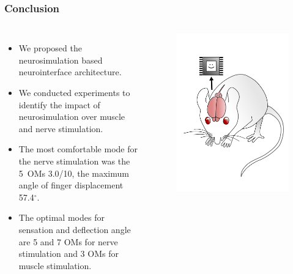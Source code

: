 \documentclass[12pt, aspectratio=169]{beamer}
\begin{document}
\begin{frame}
  \frametitle{Conclusion}
\begin{columns}[c]
 
\begin{itemize}
  \item We proposed the neurosimulation based neurointerface architecture.
  \item We conducted experiments to identify the impact of neurosimulation over muscle and nerve stimulation.
  \item The most comfortable mode for the nerve stimulation was the 5~OMs 3.0/10, the maximum angle of finger displacement 57.4$^{\circ}$.
  \item The optimal modes for sensation and deflection angle are 5 and 7 OMs for nerve stimulation and 3 OMs for muscle stimulation.
\end{itemize}

\begin{figure}
\includegraphics[width=1.0\linewidth]{mousebrainpink}
\end{figure}
\end{columns}
\end{frame}
\end{document}

